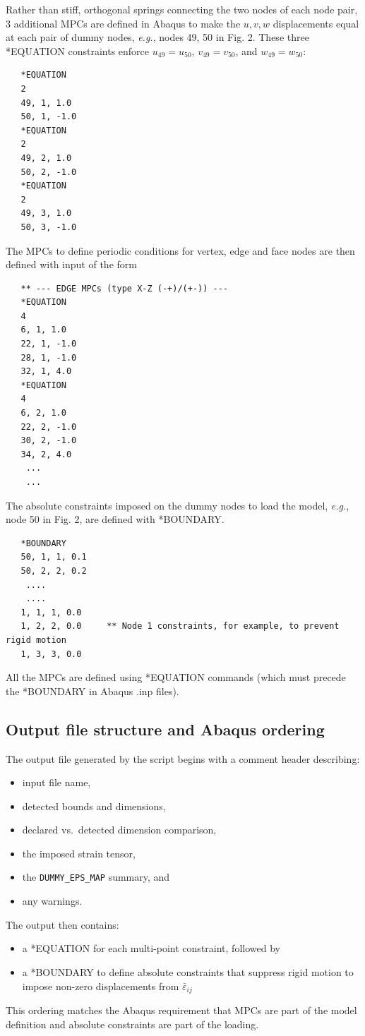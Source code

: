 \documentclass[11pt]{article}
\newcommand{\eg}{\emph{e.g.},\xspace}
\newcommand{\nid}{\noindent}
\begin{document}
Rather than stiff, orthogonal springs connecting the two nodes of each node pair,
3 additional MPCs are defined in Abaqus to make the $u, v, w$ displacements 
equal at each pair of dummy nodes, \eg nodes 49, 50 in Fig. 2. These
three *EQUATION constraints enforce $u_{49}=u_{50}$, $v_{49}=v_{50}$, 
and $w_{49}=w_{50}$:
\small
\begin{verbatim}
   *EQUATION
   2
   49, 1, 1.0
   50, 1, -1.0
   *EQUATION
   2
   49, 2, 1.0
   50, 2, -1.0
   *EQUATION
   2
   49, 3, 1.0
   50, 3, -1.0
\end{verbatim}
\normalsize
\nid The MPCs to define periodic conditions for vertex, edge and face nodes
are then defined with input of the form
\small
\begin{verbatim}
   ** --- EDGE MPCs (type X-Z (-+)/(+-)) ---
   *EQUATION
   4
   6, 1, 1.0
   22, 1, -1.0
   28, 1, -1.0
   32, 1, 4.0
   *EQUATION
   4
   6, 2, 1.0
   22, 2, -1.0
   30, 2, -1.0
   34, 2, 4.0
    ...
    ...
\end{verbatim}
\normalsize
\nid The absolute constraints imposed on the dummy nodes to 
load the model, \eg node 50 in Fig. 2, are defined with *BOUNDARY. 
\small
\begin{verbatim}
   *BOUNDARY
   50, 1, 1, 0.1
   50, 2, 2, 0.2
    ....
    ....
   1, 1, 1, 0.0
   1, 2, 2, 0.0     ** Node 1 constraints, for example, to prevent rigid motion
   1, 3, 3, 0.0
\end{verbatim}
\normalsize

\nid All the MPCs are defined using *EQUATION commands (which must precede the *BOUNDARY in Abaqus .inp files).

\subsection{Output file structure and Abaqus ordering}
The output file generated by the script begins with a comment header describing:
\begin{itemize}
\item input file name,
\item detected bounds and dimensions,
\item declared vs.\ detected dimension comparison,
\item the imposed strain tensor,
\item the \texttt{DUMMY\_EPS\_MAP} summary, and
\item any warnings.
\end{itemize}
The output then contains:
\begin{itemize}
\item a *EQUATION for each multi-point constraint, followed by
\item a *BOUNDARY to define absolute constraints that suppress
rigid motion to impose non-zero displacements from $\bar{\varepsilon}_{ij}$
\end{itemize}
This ordering matches the Abaqus requirement that MPCs are part of the model
definition and absolute constraints are part of the loading.
\end{document}

